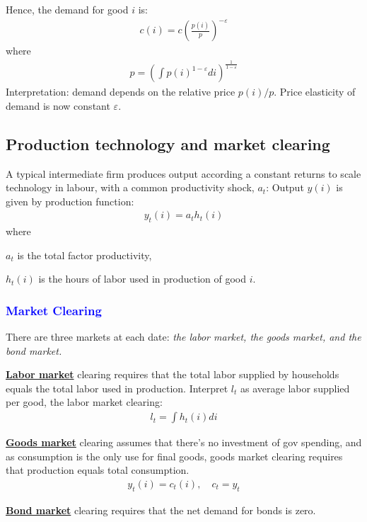 Hence, the demand for good $i$ is:
\begin{align*}
    c(i) = c \left( \frac{p(i)}{p} \right)^{-\varepsilon}
\end{align*}
where
\begin{align*}
    p = \left( \int p(i)^{1-\varepsilon} di \right)^{\frac{1}{1-\varepsilon}}
\end{align*}
Interpretation: demand depends on the relative price $p(i)/p$.
Price elasticity of demand is now constant $\varepsilon$.

\subsection{Production technology and market clearing}
A typical intermediate firm produces output according a constant returns to scale technology in labour,
with a common productivity shock, $a_t$:
Output $y(i)$ is given by production function:
\begin{align*}
    y_t(i) = a_t h_t(i)
\end{align*}
where

$a_t$ is the total factor productivity,

$h_t(i)$ is the hours of labor used in production of good $i$.

\subsubsection{\textcolor{blue}{\textbf{Market Clearing}}}

There are three markets at each date: \textit{the labor market, the goods
market, and the bond market.}

\underline{\textbf{Labor market}} clearing requires that the total labor supplied
by households equals the total labor used in production.
Interpret $l_t$ as average labor supplied per good, the labor market clearing:
\begin{align*}
    l_t = \int h_t(i) di
\end{align*}

\underline{\textbf{Goods market}} clearing assumes that there's no investment of gov spending,
and as consumption is the only use for final goods, 
goods market clearing requires that production equals total consumption.
\begin{align*}
    y_t(i) = c_t(i), \quad c_t = y_t
\end{align*}

\underline{\textbf{Bond market}} clearing requires that the net demand for bonds is zero.


